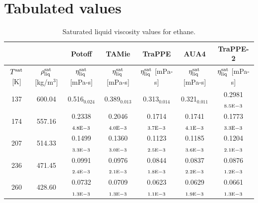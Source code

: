 \documentclass[preprint,review,11pt]{elsarticle}
\begin{document}

    \clearpage

	\section{Tabulated values} \label{SI:Tabulated}
	
	\begin{table}[H]
		\caption{Saturated liquid viscosity values for ethane.}
		\begin{center}
			\begin{tabular}{|c|c|c|c|c|c|c|}
				\hline
				&                                       & Potoff            & TAMie             & TraPPE 	& AUA4	& TraPPE-2            \\ \hline
				$T^{\rm sat}$ {[}K{]} & $\rho^{\rm sat}_{\rm liq}$ [kg/m$^3$] & $\eta_{\rm liq}^{\rm sat}$ {[}mPa-s{]} & $\eta_{\rm liq}^{\rm sat}$ {[}mPa-s{]} & $\eta_{\rm liq}^{\rm sat}$ {[}mPa-s{]} & $\eta_{\rm liq}^{\rm sat}$ {[}mPa-s{]} & $\eta_{\rm liq}^{\rm sat}$ {[}mPa-s{]} \\ \hline
				137 & 600.04 & 0.516$_{0.024}$   & 0.389$_{0.013}$   & 0.313$_{0.014}$   & 0.321$_{0.011}$   & 0.2981$_{8.5 \rm E-3}$ \\ \hline
				174 & 557.16 & 0.2338$_{4.8 \rm E-3}$ & 0.2046$_{4.0 \rm E-3}$ & 0.1714$_{3.7 \rm E-3}$ & 0.1741$_{4.1 \rm E-3}$ & 0.1773$_{3.3 \rm E-3}$ \\ \hline
				207 & 514.33 & 0.1499$_{3.3 \rm E-3}$ & 0.1360$_{3.0 \rm E-3}$ & 0.1123$_{2.5 \rm E-3}$ & 0.1185$_{3.6 \rm E-3}$ & 0.1204$_{2.1 \rm E-3}$ \\ \hline
				236 & 471.45 & 0.0991$_{2.4 \rm E-3}$ & 0.0976$_{2.1 \rm E-3}$ & 0.0844$_{1.8 \rm E-3}$ & 0.0837$_{2.2 \rm E-3}$ & 0.0876$_{1.2 \rm E-3}$ \\ \hline
				260 & 428.60 & 0.0732$_{1.3 \rm E-3}$ & 0.0709$_{1.3 \rm E-3}$ & 0.0623$_{1.1 \rm E-3}$ & 0.0629$_{1.9 \rm E-3}$ & 0.0661$_{1.3 \rm E-3}$ \\ \hline
			\end{tabular}
		\end{center}
	\end{table}
\end{document}
